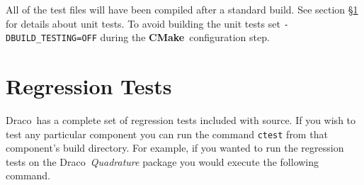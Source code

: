 \documentclass[11pt]{nmemo}
\newcommand{\comp}[1]{\normalfont\footnotesize\texttt{#1}\normalsize}
\newcommand{\draco}{{\normalfont\sffamily Draco}}
\newcommand{\metis}{{\normalfont\sffamily Metis}}
\newcommand{\cmake}{{\normalfont\bfseries CMake}}
\begin{document}
All of the test files will have been compiled after a standard build.
See section \S\ref{regression} for details about unit tests.  To avoid
building the unit tests set \comp{-DBUILD\_TESTING=OFF} during the
\cmake\ configuration step.









\section{Regression Tests}
\label{regression}

\draco\ has a complete set of regression tests included with source.
If you wish to test any particular component you can run the command
\comp{ctest} from that component's build directory.  For example, if
you wanted to run the regression tests on the
\draco\ \emph{Quadrature} package you would execute the following
command.
\end{document}
